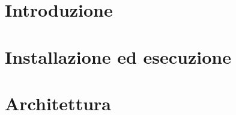 \documentclass[a4paper, oneside, openany, dvipsnames, table]{article}
\begin{document}
\copertina{} 

\newpage
\tableofcontents
\newpage
\listoffigures
\newpage

\section{Introduzione}

\newpage
\section{Installazione ed esecuzione}

\newpage
\section{Architettura}

\end{document}
